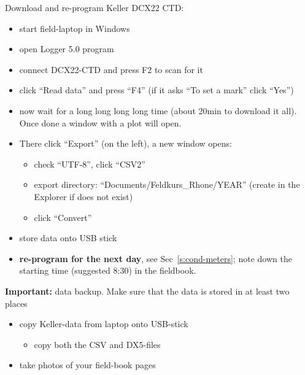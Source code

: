 \documentclass[DIV=15,halfparskip,11pt,headinclude]{scrartcl}
\begin{document}

Download and re-program Keller DCX22 CTD:
\begin{itemize}
\item start field-laptop in Windows
\item open Logger 5.0 program
\item connect DCX22-CTD and press F2 to scan for it
\item click ``Read data'' and press ``F4''
  (if it asks ``To set a mark'' click ``Yes'')
\item now wait for a long long long long time (about 20min to
  download it all).  Once done a window with a plot will open.
\item There click ``Export'' (on the left), a new window opens:
  \begin{itemize}
  \item check ``UTF-8'', click ``CSV2''
  \item export directory: ``Documents/Feldkurs\_Rhone/YEAR'' (create
    in the Explorer if does not exist)
  \item click ``Convert''
  \end{itemize}
\item store data onto USB stick
\item \textbf{re-program for the next day}, see Sec~\ref{s:cond-meters}; note
  down the starting time (suggested 8:30) in the fieldbook.
\end{itemize}

\textbf{Important:} data backup.  Make sure that the data is
stored in at least two places
\begin{itemize}
\item copy Keller-data from laptop onto USB-stick
  \begin{itemize}
  \item copy both the CSV and DX5-files
  \end{itemize}
\item take photos of your field-book pages
\end{itemize}
\end{document}
